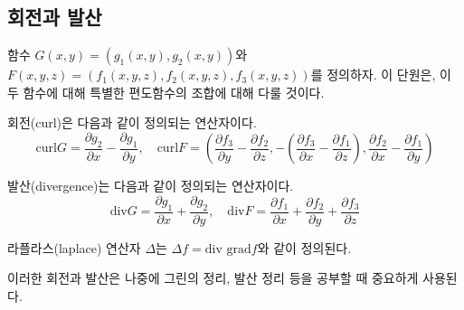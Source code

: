 \subsection{회전과 발산}
함수 $G(x,y)=(g_1(x,y),g_2(x,y))$와 $F(x,y,z)=(f_1(x,y,z),f_2(x,y,z),f_3(x,y,z))$를 정의하자. 이 단원은, 이 두 함수에 대해 특별한 편도함수의 조합에 대해 다룰 것이다.

\begin{definition}[회전]
회전(curl)은 다음과 같이 정의되는 연산자이다.
$$
\text{curl} G = \frac{\partial g_2}{\partial x} - \frac{\partial g_1}{\partial y},\quad \text{curl} F = \left( \frac{\partial f_3}{\partial y} - \frac{\partial f_2}{\partial z}, - \left( \frac{\partial f_3}{\partial x} - \frac{\partial f_1}{\partial z} \right), \frac{\partial f_2}{\partial x} - \frac{\partial f_1}{\partial y} \right)
$$
\end{definition}

\begin{definition}[발산]
발산(divergence)는 다음과 같이 정의되는 연산자이다.
$$
\text{div} G = \frac{\partial g_1}{\partial x} + \frac{\partial g_2}{\partial y},\quad \text{div} F = \frac{\partial f_1}{\partial x} + \frac{\partial f_2}{\partial y} + \frac{\partial f_3}{\partial z}
$$

\begin{definition}
라플라스(laplace) 연산자 $\Delta$는 $\Delta f = \text{div grad} f$와 같이 정의된다.
\end{definition}

이러한 회전과 발산은 나중에 그린의 정리, 발산 정리 등을 공부할 때 중요하게 사용된다.

\end{definition}
